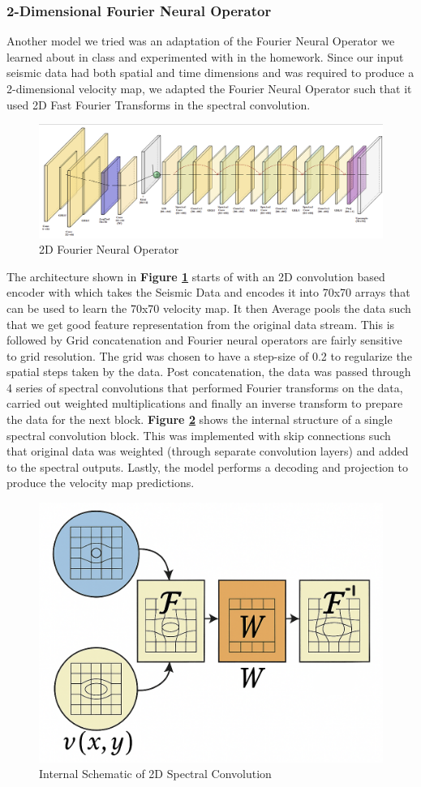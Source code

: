 \documentclass{article}
\begin{document}
\subsubsection{2-Dimensional Fourier Neural Operator}

Another model we tried was an adaptation of the Fourier Neural Operator \cite{fno} we learned about in class and experimented with in the homework. Since our input seismic data had both spatial and time dimensions and was required to produce a 2-dimensional velocity map, we adapted the Fourier Neural Operator such that it used 2D Fast Fourier Transforms in the spectral convolution.

\begin{figure}[H]
    \centering
    \includegraphics[width=0.5\linewidth]{figures/FNO2D.png}
    \caption{2D Fourier Neural Operator}
    \label{fig:fno-2d}
\end{figure}

The architecture shown in \textbf{Figure \ref{fig:fno-2d}} starts of with an 2D convolution based encoder with which takes the Seismic Data and encodes it into 70x70 arrays that can be used to learn the 70x70 velocity map. It then Average pools the data such that we get good feature representation from the original data stream. This is followed by Grid concatenation and Fourier neural operators are fairly sensitive to grid resolution. The grid was chosen to have a step-size of 0.2 to regularize the spatial steps taken by the data. Post concatenation, the data was passed through 4 series of spectral convolutions that performed Fourier transforms on the data,  carried out weighted multiplications and finally an inverse transform to prepare the data for the next block. \textbf{Figure \ref{fig:spec-conv}} shows the internal structure of a single spectral convolution block. This was implemented with skip connections such that original data was weighted (through separate convolution layers) and added to the spectral outputs. Lastly, the model performs a decoding and projection to produce the velocity map predictions.

\begin{figure}[H]
    \centering
    \includegraphics[width=0.5\linewidth]{figures/spectralconv2d.png}
    \caption{Internal Schematic of 2D Spectral Convolution}
    \label{fig:spec-conv}
\end{figure}
\end{document}
